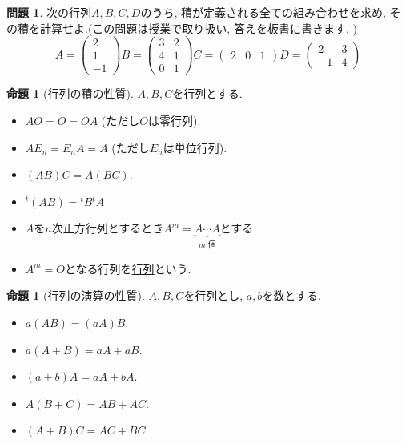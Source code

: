 \documentclass[dvipdfmx,a4paper,11pt]{article}
\theoremstyle{definition}
\newtheorem{prop}[thm]{命題}
\newtheorem{ques}[thm]{問題}
\begin{document}
 \begin{ques}
 次の行列$A,B,C,D$のうち, 積が定義される全ての組み合わせを求め, その積を計算せよ.(この問題は授業で取り扱い, 答えを板書に書きます. )
 $$
  A=\begin{pmatrix}
 2 \\ 1\\-1
 \end{pmatrix} 
B= \begin{pmatrix}
 3 &2\\
 4&1\\
 0&1
 \end{pmatrix} 
 C=
  \begin{pmatrix}
 2 &0&1 
 \end{pmatrix}
 D= \begin{pmatrix}
 2&3\\
 -1&4
 \end{pmatrix}
 $$
 \end{ques}

 
 \begin{tcolorbox}[
    colback = white,
    colframe = green!35!black,
    fonttitle = \bfseries,
    breakable = true]
    \begin{prop}[行列の積の性質]
$A,B,C$を行列とする.
 \begin{itemize}
   \setlength{\parskip}{0cm} 
  \setlength{\itemsep}{0cm}
 \item $AO =O = OA$ (ただし$O$は零行列).
  \item $AE_{n}=E_{n}A =A$ (ただし$E_n$は単位行列). 
  \item $(AB)C = A(BC)$.　
  \item ${}^{t}(AB) = {}^{t}B {}^{t}A$
 \end{itemize}
  \end{prop}
 \end{tcolorbox}
\begin{itemize}
\item $A$を$n$次正方行列とするとき$A^{m} = \underbrace{A \cdots A}_{m \text{ 個}}$とする
\item $A^{m}=O$となる行列を\underline{行列}という.
\end{itemize}

 \begin{tcolorbox}[
    colback = white,
    colframe = green!35!black,
    fonttitle = \bfseries,
    breakable = true]
    \begin{prop}[行列の演算の性質]
$A,B,C$を行列とし, $a,b$を数とする.
 \begin{itemize}
   \setlength{\parskip}{0cm} 
  \setlength{\itemsep}{0cm}
 \item $a(AB)=(aA)B$. 
  \item $a(A+B)=aA + aB$. 
  \item $(a+b)A = aA + bA$.　
  \item $A(B+C) = AB + AC$.
  \item $(A+B)C = AC + BC$.
 \end{itemize}
  \end{prop}
 \end{tcolorbox}
 
\end{document}
